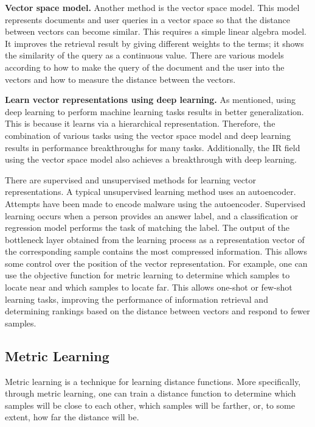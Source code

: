 \textbf{Vector space model.} Another method is the vector space model. This model represents documents and user queries in a vector space so that the distance between vectors can become similar. This requires a simple linear algebra model. It improves the retrieval result by giving different weights to the terms; it shows the similarity of the query as a continuous value. There are various models according to how to make the query of the document and the user into the vectors\cite{guo2016deep, liu2009learning} and how to measure the distance between the vectors\cite{diaz2016query, huang2013learning, roy2016using, mitra2016dual}.


\textbf{Learn vector representations using deep learning.} As mentioned, using deep learning to perform machine learning tasks results in better generalization. This is because it learns via a hierarchical representation. Therefore, the combination of various tasks using the vector space model and deep learning results in performance breakthroughs for many tasks\cite{krizhevsky2012imagenet, mikolov2013efficient, hinton2012deep}. Additionally, the IR field using the vector space model also achieves a breakthrough with deep learning\cite{huang2013learning, severyn2015learning, wan2014deep}.


There are supervised and unsupervised methods for learning vector representations. A typical unsupervised learning method uses an autoencoder. Attempts have been made to encode malware using the autoencoder. Supervised learning occurs when a person provides an answer label, and a classification or regression model performs the task of matching the label. The output of the bottleneck layer obtained from the learning process as a representation vector of the corresponding sample contains the most compressed information. This allows some control over the position of the vector representation. For example, one can use the objective function for metric learning to determine which samples to locate near and which samples to locate far. This allows one-shot or few-shot learning tasks, improving the performance of information retrieval and determining rankings based on the distance between vectors and respond to fewer samples.



\subsection{Metric Learning}
Metric learning is a technique for learning distance functions. More specifically, through metric learning, one can train a distance function to determine which samples will be close to each other, which samples will be farther, or, to some extent, how far the distance will be.

